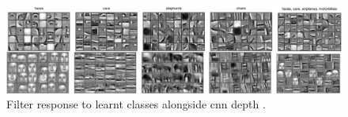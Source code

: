 
\begin{figure}[t]
    \centering
    \scriptsize
    \includegraphics[width=\textwidth]{fig/rel/images/conv_layers.png}
    \caption{Filter response to learnt classes alongside \gls{cnn} depth \autocite{lee2009convolutional}.}
    \label{fig:cnn_depth}
\end{figure}